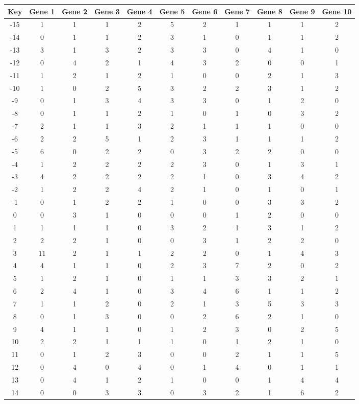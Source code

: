 \begin{tabular}{|c|c|c|c|c|c|c|c|c|c|c|}
\hline
Key & Gene 1 & Gene 2 & Gene 3 & Gene 4 & Gene 5 & Gene 6 & Gene 7 & Gene 8 & Gene 9 & Gene 10 \\
\hline
-15 & 1 & 1 & 1 & 2 & 5 & 2 & 1 & 1 & 1 & 2 \\
-14 & 0 & 1 & 1 & 2 & 3 & 1 & 0 & 1 & 1 & 2 \\
-13 & 3 & 1 & 3 & 2 & 3 & 3 & 0 & 4 & 1 & 0 \\
-12 & 0 & 4 & 2 & 1 & 4 & 3 & 2 & 0 & 0 & 1 \\
-11 & 1 & 2 & 1 & 2 & 1 & 0 & 0 & 2 & 1 & 3 \\
-10 & 1 & 0 & 2 & 5 & 3 & 2 & 2 & 3 & 1 & 2 \\
-9 & 0 & 1 & 3 & 4 & 3 & 3 & 0 & 1 & 2 & 0 \\
-8 & 0 & 1 & 1 & 2 & 1 & 0 & 1 & 0 & 3 & 2 \\
-7 & 2 & 1 & 1 & 3 & 2 & 1 & 1 & 1 & 0 & 0 \\
-6 & 2 & 2 & 5 & 1 & 2 & 3 & 1 & 1 & 1 & 2 \\
-5 & 6 & 0 & 2 & 2 & 0 & 3 & 2 & 2 & 0 & 0 \\
-4 & 1 & 2 & 2 & 2 & 2 & 3 & 0 & 1 & 3 & 1 \\
-3 & 4 & 2 & 2 & 2 & 2 & 1 & 0 & 3 & 4 & 2 \\
-2 & 1 & 2 & 2 & 4 & 2 & 1 & 0 & 1 & 0 & 1 \\
-1 & 0 & 1 & 2 & 2 & 1 & 0 & 0 & 3 & 3 & 2 \\
0 & 0 & 3 & 1 & 0 & 0 & 0 & 1 & 2 & 0 & 0 \\
1 & 1 & 1 & 1 & 0 & 3 & 2 & 1 & 3 & 1 & 2 \\
2 & 2 & 2 & 1 & 0 & 0 & 3 & 1 & 2 & 2 & 0 \\
3 & 11 & 2 & 1 & 1 & 2 & 2 & 0 & 1 & 4 & 3 \\
4 & 4 & 1 & 1 & 0 & 2 & 3 & 7 & 2 & 0 & 2 \\
5 & 1 & 2 & 1 & 0 & 1 & 1 & 3 & 3 & 2 & 1 \\
6 & 2 & 4 & 1 & 0 & 3 & 4 & 6 & 1 & 1 & 2 \\
7 & 1 & 1 & 2 & 0 & 2 & 1 & 3 & 5 & 3 & 3 \\
8 & 0 & 1 & 3 & 0 & 0 & 2 & 6 & 2 & 1 & 0 \\
9 & 4 & 1 & 1 & 0 & 1 & 2 & 3 & 0 & 2 & 5 \\
10 & 2 & 2 & 1 & 1 & 1 & 0 & 1 & 2 & 1 & 0 \\
11 & 0 & 1 & 2 & 3 & 0 & 0 & 2 & 1 & 1 & 5 \\
12 & 0 & 4 & 0 & 4 & 0 & 1 & 4 & 0 & 1 & 1 \\
13 & 0 & 4 & 1 & 2 & 1 & 0 & 0 & 1 & 4 & 4 \\
14 & 0 & 0 & 3 & 3 & 0 & 3 & 2 & 1 & 6 & 2 \\
\hline
\end{tabular}
